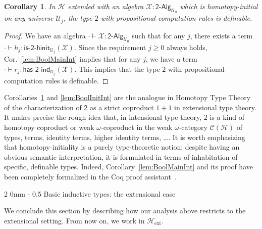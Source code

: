 \documentclass[reqno,10pt,a4paper,oneside]{amsart}
\makeatletter
\newcommand{\X}{\mathcal{X}}
\newcommand{\Bool}{\mathsf{2}}
\newcommand{\UU}{\mathcal{U}}
\newcommand{\BoolAlg}{\mathsf{2}\text{-}\mathsf{Alg}}
\newcommand{\HasBoolInd}{\mathsf{has}\text{-}\mathsf{2}\text{-}\mathsf{ind}}
\newcommand{\IsBoolHInit}{\mathsf{is}\text{-}\mathsf{2}\text{-}\mathsf{hinit}}
\newcommand{\Hint}{\mathcal{H}}
\newcommand{\Hext}{\mathcal{H}_{\mathrm{ext}}}
\renewcommand{\subsection}{\@startsection
  {subsection}%
  {2}%
  {0mm}%
  {-\baselineskip}%
  {0.5\baselineskip}%
  {\normalfont\normalsize\bf}}%
\numberwithin{equation}{section}
\theoremstyle{mythm}
\newtheorem{corollary}[theorem]{Corollary}
\theoremstyle{mydef}
\theoremstyle{myrmk}
\makeatother
\begin{document}
\begin{corollary}\label{lem:BoolCharInt}
In $\Hint$ extended with an algebra $\X : \BoolAlg_{\UU_0}$ which is homotopy-initial on any universe $\UU_j$, the type $\Bool$ with propositional computation rules is definable. 
\end{corollary}
\begin{proof}
We have an algebra $\cdot \vdash \X : \BoolAlg_{\UU_0}$ such that for any $j$, there exists a term $\cdot \vdash h_j  : \IsBoolHInit_{\UU_j}(\X)$. Since the requirement $j \geq 0$ always holds, Cor.~\ref{lem:BoolMainInt} implies that for any $j$, we have a term $\cdot \vdash r_j : \HasBoolInd_{\UU_j}(\X)$. This implies that the type $\Bool$ with propositional computation rules is definable.
\end{proof}

Corollaries~\ref{lem:BoolCharInt} and \ref{lem:BoolInitInt} are the analogue in Homotopy Type Theory of the characterization of 
$\Bool$ as a strict coproduct $1+1$ in extensional type theory. It makes precise the rough idea that, 
in intensional type theory, $\Bool$ is a kind of homotopy coproduct or weak $\omega$-coproduct 
in the weak $\omega$-category $\mathcal{C}(\Hint)$ of types, terms, identity terms, higher identity terms, \ldots.  
It is worth emphasizing that homotopy-initiality is a purely type-theoretic notion; despite having an obvious semantic interpretation, it is formulated in terms of inhabitation of specific, definable types. Indeed, Corollary~\ref{lem:BoolMainInt} and its proof have been completely formalized in the Coq proof assistant~\cite{AwodeyS:indtht}.



\subsection{Basic inductive types: the extensional case}

We conclude this section by describing how our analysis above restricts to the extensional setting. From now on, we work in $\Hext$. 
\end{document}
